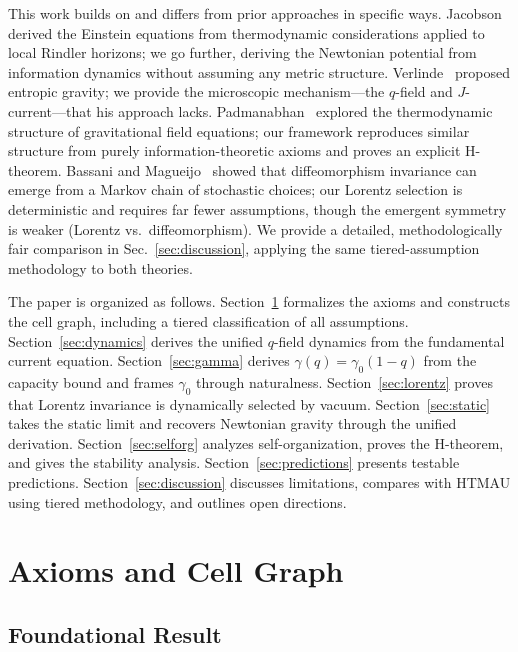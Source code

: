 \documentclass[aps,prd,twocolumn,showpacs,superscriptaddress,preprintnumbers]{revtex4-2}
\begin{document}
This work builds on and differs from prior approaches in specific ways.
Jacobson~\cite{Jacobson:1995ab} derived the Einstein equations from thermodynamic considerations applied to local Rindler horizons; we go further, deriving the Newtonian potential from information dynamics without assuming any metric structure.
Verlinde~\cite{Verlinde:2010hp} proposed entropic gravity; we provide the microscopic mechanism---the $q$-field and $J$-current---that his approach lacks.
Padmanabhan~\cite{Padmanabhan:2010} explored the thermodynamic structure of gravitational field equations; our framework reproduces similar structure from purely information-theoretic axioms and proves an explicit H-theorem.
Bassani and Magueijo~\cite{Bassani:2025htma} showed that diffeomorphism invariance can emerge from a Markov chain of stochastic choices; our Lorentz selection is deterministic and requires far fewer assumptions, though the emergent symmetry is weaker (Lorentz vs.\ diffeomorphism).
We provide a detailed, methodologically fair comparison in Sec.~\ref{sec:discussion}, applying the same tiered-assumption methodology to both theories.

The paper is organized as follows.
Section~\ref{sec:axioms} formalizes the axioms and constructs the cell graph, including a tiered classification of all assumptions.
Section~\ref{sec:dynamics} derives the unified $q$-field dynamics from the fundamental current equation.
Section~\ref{sec:gamma} derives $\gamma(q)=\gamma_0(1-q)$ from the capacity bound and frames $\gamma_0$ through naturalness.
Section~\ref{sec:lorentz} proves that Lorentz invariance is dynamically selected by vacuum.
Section~\ref{sec:static} takes the static limit and recovers Newtonian gravity through the unified derivation.
Section~\ref{sec:selforg} analyzes self-organization, proves the H-theorem, and gives the stability analysis.
Section~\ref{sec:predictions} presents testable predictions.
Section~\ref{sec:discussion} discusses limitations, compares with HTMAU using tiered methodology, and outlines open directions.

\section{Axioms and Cell Graph}
\label{sec:axioms}

\subsection{Foundational Result}
\end{document}
